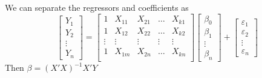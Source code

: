 We can separate the regressors and coefficients as
\begin{equation*}
            \begin{bmatrix}
Y_1 \\ Y_2 \\ \vdots \\ Y_n
\end{bmatrix} =
\begin{bmatrix}
1 & X_{11} & X_{21} & \ldots & X_{k1}\\
1 & X_{12} & X_{22} & \ldots & X_{k2}\\
\vdots & \vdots & \vdots & \vdots & \vdots \\
1 & X_{1m} & X_{2n} & \ldots & X_{kn}\\
\end{bmatrix}
\begin{bmatrix}
\beta_0 \\
\beta_1 \\
\vdots\\
\beta_n
\end{bmatrix}+
\begin{bmatrix}
\varepsilon_1 \\
\varepsilon_2 \\
\vdots\\
\varepsilon_n
\end{bmatrix}
\end{equation*}
Then $\beta = (X'X)^{-1}X'Y$


